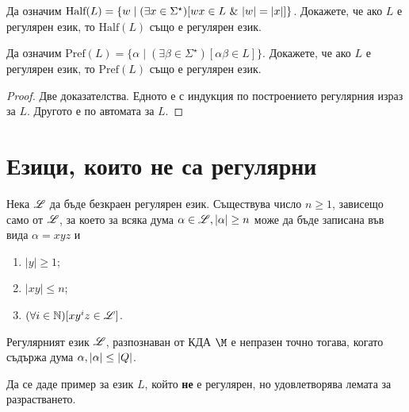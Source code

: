 \begin{problem}
  Да означим $\mbox{Half}(L) = \{w\mid (\exists x \in \Sigma^\star)[wx \in L\ \&\ \vert{w}\vert = \vert{x}\vert]\}$.
  Докажете, че ако $L$ е регулярен език, то $\mbox{Half}(L)$ също е регулярен език.
\end{problem}

\begin{problem}
  Да означим $\mbox{Pref}(L) = \{\alpha \mid (\exists \beta \in \Sigma^\star)[\alpha\beta \in L]\}$.
  Докажете, че ако $L$ е регулярен език, то $\mbox{Pref}(L)$ също е регулярен език.
\end{problem}
\begin{proof}
  Две доказателства. Едното е с индукция по построението регулярния израз за $L$.
  Другото е по автомата за $L$.
\end{proof}

\section{Езици, които не са регулярни}
\begin{lemma}
  Нека $\mathscr{L}$ да бъде безкраен регулярен език.
  Съществува число $n\geq 1$, зависещо само от $\mathscr{L}$, 
  за което за всяка дума $\alpha\in \mathscr{L}, \vert{\alpha}\vert\geq n$ може да 
  бъде записана във вида $\alpha = xyz$ и 
  \begin{enumerate}
  \item
    $|y|\geq 1$;
  \item
    $|xy|\leq n$;
  \item
    $(\forall i\in\mathbb{N})[xy^iz \in \mathscr{L}]$.
  \end{enumerate}
\end{lemma}

\begin{crl}
  Регулярният език $\mathscr{L}$, 
  разпознаван от КДА $\M$ е непразен точно тогава, когато съдържа дума $\alpha, \vert{\alpha}\vert \leq \vert{Q}\vert$.
\end{crl}

\begin{problem}
  Да се даде пример за език $L$, който {\bf не} е регулярен, но удовлетворява
  лемата за разрастването.
\end{problem}

